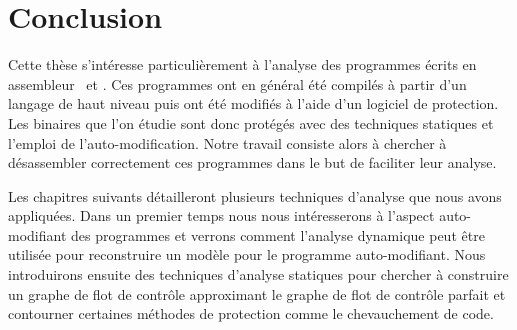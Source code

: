 \section{Conclusion}
Cette thèse s'intéresse particulièrement à l'analyse des programmes écrits en assembleur \xq\ et \xs. Ces programmes ont en général été compilés à partir d'un langage de haut niveau puis ont été modifiés à l'aide d'un logiciel de protection. Les binaires que l'on étudie sont donc protégés avec des techniques statiques et l'emploi de l'auto-modification. Notre travail consiste alors à chercher à désassembler correctement ces programmes dans le but de faciliter leur analyse.

Les chapitres suivants détailleront plusieurs techniques d'analyse que nous avons appliquées. 
Dans un premier temps nous nous intéresserons à l'aspect auto-modifiant des programmes et verrons comment l'analyse dynamique peut être utilisée pour reconstruire un modèle pour le programme auto-modifiant. 
Nous introduirons ensuite des techniques d'analyse statiques pour chercher à construire un graphe de flot de contrôle approximant le graphe de flot de contrôle parfait et contourner certaines méthodes de protection comme le chevauchement de code.
